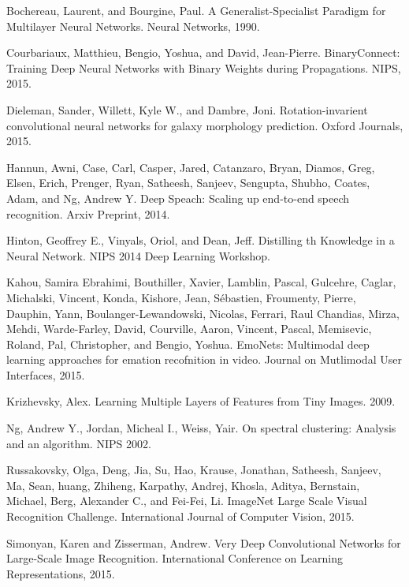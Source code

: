\documentclass[12pt]{article}
\begin{document}
\begin{thebibliography}{99.}%


    Bochereau, Laurent, and Bourgine, Paul. A Generalist-Specialist Paradigm for
Multilayer Neural Networks. Neural Networks, 1990.


Courbariaux, Matthieu, Bengio, Yoshua, and David, Jean-Pierre. BinaryConnect:
Training Deep Neural Networks with Binary Weights during Propagations. NIPS,
2015.


Dieleman, Sander, Willett, Kyle W., and Dambre, Joni. Rotation-invarient
convolutional neural networks for galaxy morphology prediction. Oxford Journals,
2015.


Hannun, Awni, Case, Carl, Casper, Jared, Catanzaro, Bryan, Diamos, Greg, Elsen,
Erich, Prenger, Ryan, Satheesh, Sanjeev, Sengupta, Shubho, Coates, Adam, and Ng,
Andrew Y. Deep Speach: Scaling up end-to-end speech recognition. Arxiv Preprint,
2014.


Hinton, Geoffrey E., Vinyals, Oriol, and Dean, Jeff. Distilling th Knowledge in
a Neural Network. NIPS 2014 Deep Learning Workshop.


Kahou, Samira Ebrahimi, Bouthiller, Xavier, Lamblin, Pascal, Gulcehre, Caglar,
Michalski, Vincent, Konda, Kishore, Jean, Sébastien, Froumenty, Pierre, Dauphin,
Yann, Boulanger-Lewandowski, Nicolas, Ferrari, Raul Chandias, Mirza, Mehdi,
Warde-Farley, David, Courville, Aaron, Vincent, Pascal, Memisevic, Roland, Pal,
Christopher, and Bengio, Yoshua. EmoNets: Multimodal deep learning approaches
for emation recofnition in video. Journal on Mutlimodal User Interfaces, 2015.


Krizhevsky, Alex. Learning Multiple Layers of Features from Tiny Images. 2009.


Ng, Andrew Y., Jordan, Micheal I., Weiss, Yair. On spectral clustering: Analysis
and an algorithm. NIPS 2002.


Russakovsky, Olga, Deng, Jia, Su, Hao, Krause, Jonathan, Satheesh, Sanjeev, Ma,
Sean, huang, Zhiheng, Karpathy, Andrej, Khosla, Aditya, Bernstain, Michael,
Berg, Alexander C., and Fei-Fei, Li. ImageNet Large Scale Visual Recognition
Challenge. International Journal of Computer Vision, 2015.


Simonyan, Karen and Zisserman, Andrew. Very Deep Convolutional Networks for
Large-Scale Image Recognition. International Conference on Learning
Representations, 2015.



\end{thebibliography}
\end{document}
